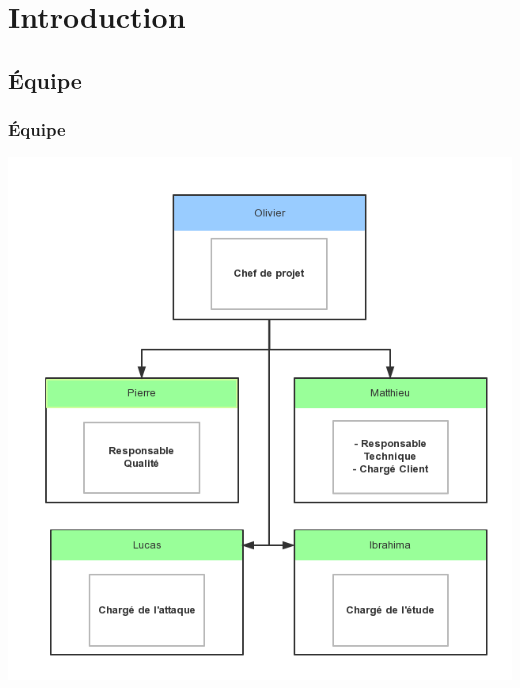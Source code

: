 \section{Introduction}
\subsection{Équipe}
\begin{frame}
    \frametitle{\color{white}Équipe}
  \begin{center}
    \includegraphics[scale=0.30]{guipgteam.png}
  \end{center}
\end{frame}
